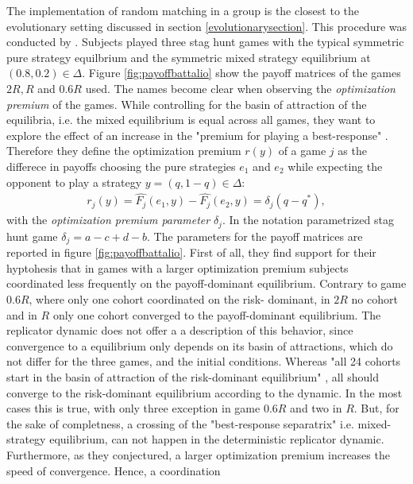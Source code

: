 \documentclass[11pt]{article}
\begin{document}
The implementation of random matching in a group is the closest to the 
evolutionary setting discussed in section \ref{evolutionarysection}. This 
procedure was conducted by \textcite{battalio_optimization_2001}. Subjects 
played three stag hunt games with the typical symmetric pure strategy
equilbrium and the symmetric mixed strategy equilibrium at $(0.8,0.2) \in
\Delta$. Figure \ref{fig:payoffbattalio} show the payoff matrices of the
games $2R, R$ and $0.6R$ used. The names become clear when observing the 
\textit{optimization premium} of the games. While controlling for the basin of 
attraction of the equilibria, i.e. the mixed equilibrium is equal across all games,
they want to explore the effect of an increase in the "premium for playing
a best-response" \parencite[751]{battalio_optimization_2001}. 
Therefore they define the optimization premium $r(y)$ of a game $j$ as the 
differece in payoffs choosing the pure strategies $e_1$ and $e_2$ 
while expecting the opponent to play a strategy $y=(q,1-q) \in \Delta$:
\begin{align}
        r_j(y)= \hat{F_j}(e_1,y) - \hat{F_j}(e_2,y) = \delta_j(q-q^*),
\end{align}
with the \textit{optimization premium parameter} $\delta_j$. In the notation
parametrized stag hunt game $\delta_j = a - c + d - b$.
The parameters for the payoff matrices are reported in figure \ref{fig:payoffbattalio}. 
First of all, they find support for their hyptohesis that in games with a 
larger optimization premium subjects coordinated less frequently on the 
payoff-dominant equilibrium. 
Contrary to game $0.6R$, where only one cohort coordinated on the risk-
dominant, in $2R$ no cohort and in $R$ only one cohort converged to the 
payoff-dominant equilibrium. The replicator dynamic does not offer a
a description of this behavior, since convergence to a equilibrium only 
depends on its basin of attractions, which do not differ for the three games, 
and the initial conditions. Whereas "all 24 cohorts start in the basin of attraction
of the risk-dominant equilibrium" \parencite{battalio_optimization_2001}, 
all should converge to the risk-dominant equilibrium according to the dynamic.
In the most cases this is true, with only three exception in game $0.6R$ 
and two in $R$.
But, for the sake of completness, a crossing of the  
"best-response separatrix" \parencite{battalio_optimization_2001} i.e. 
mixed-strategy equilibrium, can not happen in the deterministic replicator 
dynamic.
Furthermore, as they conjectured, a larger
optimization premium increases the speed of convergence. Hence, a coordination
\end{document}
